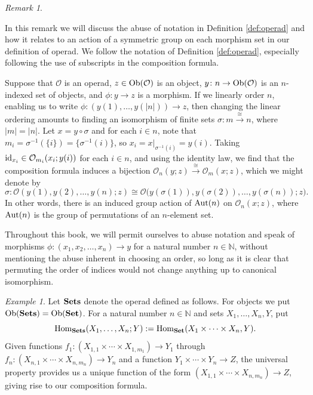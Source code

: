 \documentclass{book}
\def\tn{\textnormal}
\def\mc{\mathcal}
\def\NN{{\mathbb N}}
\def\Hom{\tn{Hom}}
\def\Aut{\tn{Aut}}
\def\Ob{\tn{Ob}}
\def\to{\rightarrow}
\def\taking{\colon}
\def\too{\longrightarrow}
\def\iso{\cong}
\def\m1{{-1}}
\newcommand{\To}[1]{\xrightarrow{#1}}
\def\id{\tn{id}}
\def\Set{{\bf Set}}
\def\Sets{{\bf Sets}}
\def\mcO{\mc{O}}
\theoremstyle{remark}
\newtheorem{remark}[subsubsection]{Remark}
\newtheorem{example}[subsubsection]{Example}
\theoremstyle{definition}
\begin{document}
\begin{remark}\label{rem:symmetry}

In this remark we will discuss the abuse of notation in Definition \ref{def:operad} and how it relates to an action of a symmetric group on each morphism set in our definition of operad. We follow the notation of Definition \ref{def:operad}, especially following the use of subscripts in the composition formula.

Suppose that $\mcO$ is an operad, $z\in\Ob(\mcO)$ is an object, $y\taking n\to\Ob(\mcO)$ is an $n$-indexed set of objects, and $\phi\taking y\to z$ is a morphism. If we linearly order $n$, enabling us to write $\phi\taking (y(1),\ldots,y(|n|))\to z$, then changing the linear ordering amounts to finding an isomorphism of finite sets $\sigma\taking m\To{\iso} n$, where $|m|=|n|$. Let $x=y\circ\sigma$ and for each $i\in n$, note that $m_i=\sigma^\m1(\{i\})=\{\sigma^\m1(i)\}$, so $x_i=x|_{\sigma^\m1(i)}=y(i)$. Taking $\id_{x_i}\in\mcO_{m_i}(x_i;y(i))$ for each $i\in n$, and using the identity law, we find that the composition formula induces a bijection $\mcO_n(y;z)\To{\iso}\mcO_m(x;z)$, which we might denote by 
$$\sigma\taking\mcO(y(1),y(2),\ldots,y(n);z)\iso\mcO\big(y(\sigma(1)),y(\sigma(2)),\ldots,y(\sigma(n));z\big).$$
In other words, there is an induced group action of $\Aut(n)$ on $\mcO_n(x;z)$, where $\Aut(n)$ is the group of permutations of an $n$-element set.

Throughout this book, we will permit ourselves to abuse notation and speak of morphisms $\phi\taking (x_1,x_2,\ldots,x_n)\to y$ for a natural number $n\in\NN$, without mentioning the abuse inherent in choosing an order, so long as it is clear that permuting the order of indices would not change anything up to canonical isomorphism.

\end{remark}

\begin{example}\index{an operad!$\Sets$}

Let $\Sets$ denote the operad defined as follows. For objects we put $\Ob(\Sets)=\Ob(\Set)$. For a natural number $n\in\NN$ and sets $X_1,\ldots,X_n,Y$, put 
$$\Hom_\Sets(X_1,\ldots,X_n;Y):=\Hom_\Set(X_1\times\cdots\times X_n,Y).$$
Given functions $f_1\taking(X_{1,1}\times\cdots\times X_{1,m_1})\to Y_1$ through $f_n\taking (X_{n,1}\times\cdots\times X_{n,m_n})\to Y_n$ and a function $Y_1\times\cdots\times Y_n\to Z$, the universal property provides us a unique function of the form $(X_{1,1}\times\cdots\times X_{n,m_n})\too Z$, giving rise to our composition formula.

\end{example}
\end{document}
